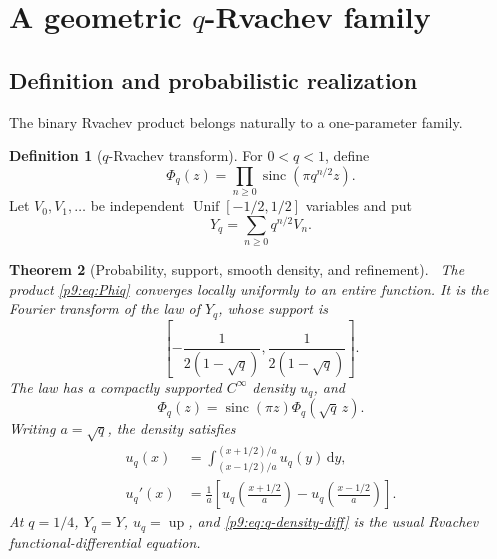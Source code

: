 \documentclass[11pt]{article}
\numberwithin{equation}{section}
\newtheorem{theorem}{Theorem}[section]
\theoremstyle{definition}
\newtheorem{definition}[theorem]{Definition}
\theoremstyle{remark}
\newcommand{\Up}{\operatorname{up}}
\newcommand{\sinc}{\operatorname{sinc}}
\newcommand{\dd}{\,\mathrm d}
\begin{document}
\section{A geometric $q$-Rvachev family}
\label{p9:sec:qfamily}

\subsection{Definition and probabilistic realization}
The binary Rvachev product belongs naturally to a one-parameter family.

\begin{definition}[$q$-Rvachev transform]
For $0<q<1$, define
\begin{equation}
 \Phi_q(z)=\prod_{n\ge0}\sinc(\pi q^{n/2}z).               \label{p9:eq:Phiq}
\end{equation}
Let $V_0,V_1,\ldots$ be independent $\operatorname{Unif}[-1/2,1/2]$ variables and put
\begin{equation}
 Y_q=\sum_{n\ge0}q^{n/2}V_n.                               \label{p9:eq:Yq}
\end{equation}
\end{definition}

\begin{theorem}[Probability, support, smooth density, and refinement]\label{p9:thm:q-density}
\statusN\ The product \eqref{p9:eq:Phiq} converges locally uniformly to an entire function.
It is the Fourier transform of the law of $Y_q$, whose support is
\[
 \left[-\frac1{2(1-\sqrt q)},\frac1{2(1-\sqrt q)}\right].
\]
The law has a compactly supported $C^\infty$ density $u_q$, and
\begin{equation}
 \Phi_q(z)=\sinc(\pi z)\Phi_q(\sqrt q\,z).                 \label{p9:eq:q-refine-Fourier}
\end{equation}
Writing $a=\sqrt q$, the density satisfies
\begin{align}
 u_q(x)&=\int_{(x-1/2)/a}^{(x+1/2)/a}u_q(y)\dd y,           \label{p9:eq:q-density-integral}\\
 u_q'(x)&=\frac1a\left[u_q\!\left(\frac{x+1/2}{a}\right)
                     -u_q\!\left(\frac{x-1/2}{a}\right)\right]. \label{p9:eq:q-density-diff}
\end{align}
At $q=1/4$, $Y_q=Y$, $u_q=\Up$, and \eqref{p9:eq:q-density-diff} is the usual Rvachev
functional-differential equation.
\end{theorem}
\end{document}

